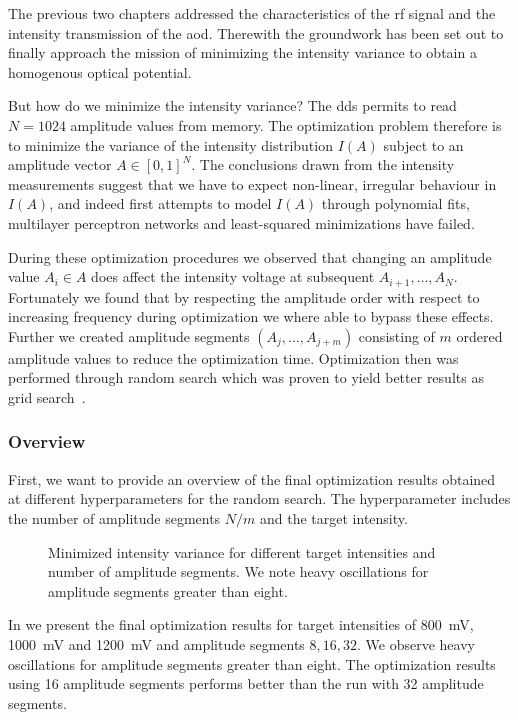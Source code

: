 The previous two chapters addressed the characteristics of the \gls{rf}
signal and the intensity transmission of the \gls{aod}. Therewith the
groundwork has been set out to finally approach the mission of minimizing the
intensity variance to obtain a homogenous optical potential.

But how do we minimize the intensity variance? The \gls{dds} permits to read
$N=1024$ amplitude values from memory. The optimization problem therefore is to
minimize the variance of the intensity distribution $I(A)$ subject to an
amplitude vector $A\in{[0,1]}^N$. The conclusions drawn from the intensity
measurements suggest that we have to expect non-linear, irregular behaviour
in $I(A)$, and indeed first attempts to model $I(A)$ through polynomial fits,
multilayer perceptron networks and least-squared minimizations have failed.

During these optimization procedures we observed that changing an amplitude
value $A_i\in A$ does affect the intensity voltage at subsequent
$A_{i+1},\dots,A_N$. Fortunately we found that by respecting the amplitude
order with respect to increasing frequency during optimization we where able
to bypass these effects. Further we created amplitude segments
$\left(A_j,\dots,A_{j+m}\right)$ consisting of $m$ ordered amplitude values
to reduce the optimization time. Optimization then was performed through
random search which was proven to yield better results as grid
search~\cite{Bergstra2012}.

\subsubsection{Overview}

First, we want to provide an overview of the final optimization results
obtained at different hyperparameters for the random search. The
hyperparameter includes the number of amplitude segments $N/m$ and the target
intensity.
\begin{figure}[htb]
  \centering
  \begin{adjustbox}{width=\textwidth}
  \end{adjustbox}
  \caption{Minimized intensity variance for different target intensities
    and number of amplitude segments. We note heavy oscillations for
    amplitude segments greater than eight.
  }\label{fig:intensity_optimization_overview}
\end{figure}
In  we present the final
optimization results for target intensities of \SI{800}{\milli\volt},
\SI{1000}{\milli\volt} and \SI{1200}{\milli\volt} and amplitude segments
$8,16,32$. We observe heavy oscillations for amplitude segments greater than
eight. The optimization results using \num{16} amplitude segments performs
better than the run with \num{32} amplitude segments.

